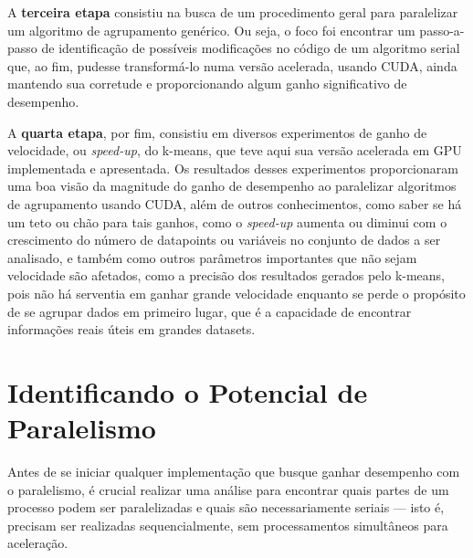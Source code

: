 \documentclass[12pt,
openright, 
oneside, %
a4paper,    %
brazil]{facom-ufu-abntex2}
\begin{document}

A \textbf{terceira etapa} consistiu na busca de um procedimento geral para paralelizar um algoritmo de agrupamento genérico. Ou seja, o foco foi encontrar um passo-a-passo de identificação de possíveis modificações no código de um algoritmo serial que, ao fim, pudesse transformá-lo numa versão acelerada, usando CUDA, ainda mantendo sua corretude e proporcionando algum ganho significativo de desempenho.

A \textbf{quarta etapa}, por fim, consistiu em diversos experimentos de ganho de velocidade, ou \textit{speed-up}, do k-means, que teve aqui sua versão acelerada em GPU implementada e apresentada. Os resultados desses experimentos proporcionaram uma boa visão da magnitude do ganho de desempenho ao paralelizar algoritmos de agrupamento usando CUDA, além de outros conhecimentos, como saber se há um teto ou chão para tais ganhos, como o \textit{speed-up} aumenta ou diminui com o crescimento do número de datapoints ou variáveis no conjunto de dados a ser analisado, e também como outros parâmetros importantes que não sejam velocidade são afetados, como a precisão dos resultados gerados pelo k-means, pois não há serventia em ganhar grande velocidade enquanto se perde o propósito de se agrupar dados em primeiro lugar, que é a capacidade de encontrar informações reais úteis em grandes datasets.




\section{Identificando o Potencial de Paralelismo}
\label{chp:identifPotencParalel}

Antes de se iniciar qualquer implementação que busque ganhar desempenho com o paralelismo, é crucial realizar uma análise para encontrar quais partes de um processo podem ser paralelizadas e quais são necessariamente seriais --- isto é, precisam ser realizadas sequencialmente, sem processamentos simultâneos para aceleração.
\end{document}
